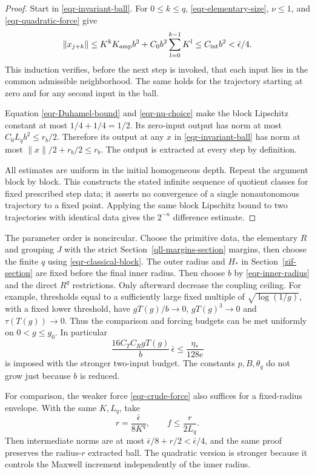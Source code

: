 \documentclass[11pt]{article}
\theoremstyle{remark}
\begin{document}
\begin{proof}
Start in \eqref{eqr-invariant-ball}. For $0\le k\le q$,
\eqref{eqr-elementary-size}, $\nu\le1$, and
\eqref{eqr-quadratic-force} give
\begin{equation}
 \|x_{j+k}\|
 \le K^kK_{\rm amp}b^2+C_0b^2\sum_{l=0}^{k-1}K^l
 \le C_{\rm int}b^2<\bar\epsilon/4.
 \label{eqr-intermediate-bound}
\end{equation}
This induction verifies, before the next step is invoked, that
each input lies in the common admissible neighborhood. The
same holds for the trajectory starting at zero and for any
second input in the ball.

Equation \eqref{eqr-Duhamel-bound} and
\eqref{eqr-nu-choice} make the block Lipschitz constant at most
$1/4+1/4=1/2$. Its zero-input output has norm at most
$C_0L_qb^2\le r_b/2$. Therefore its output at any $x$ in
\eqref{eqr-invariant-ball} has norm at most
$\|x\|/2+r_b/2\le r_b$.
The output is extracted at every step by definition.

All estimates are uniform in the initial homogeneous depth.
Repeat the argument block by block. This constructs the
stated infinite sequence of quotient classes for fixed
prescribed step data; it asserts no convergence of a single
nonautonomous trajectory to a fixed point. Applying the same
block Lipschitz bound to two trajectories with identical data
gives the $2^{-n}$ difference estimate.
\end{proof}

The parameter order is noncircular. Choose the primitive data,
the elementary $R$ and grouping $J$ with the strict
Section~\ref{qll-margins-section} margins, then choose the finite
$q$ using \eqref{eqr-classical-block}. The outer radius and
$H_*$ in Section~\ref{zif-section} are fixed before the final
inner radius. Then choose $b$ by
\eqref{eqr-inner-radius} and the direct $R^q$ restrictions.
Only afterward decrease the coupling ceiling. For example,
thresholds equal to a sufficiently large fixed multiple of
$\sqrt{\log(1/g)}$, with a fixed lower threshold, have
$gT(g)/b\to0$, $gT(g)^3\to0$ and $\tau(T(g))\to0$.
Thus the comparison and forcing budgets can be met uniformly
on $0<g\le g_0$. In particular
\[
 \frac{16C_TC_RgT(g)}b\,\bar\epsilon
                   \le\frac{\eta_*}{128e}
\]
is imposed with the stronger two-input budget.
The constants $p,B,\theta_q$ do not grow just because $b$
is reduced.

For comparison, the weaker force \eqref{eqr-crude-force} also
suffices for a fixed-radius envelope. With the same $K,L_q$,
take
\begin{equation}
 r=\frac{\bar\epsilon}{8K^q},\qquad
 f\le\frac{r}{2L_q}.
 \label{eqr-crude-envelope}
\end{equation}
Then intermediate norms are at most
$\bar\epsilon/8+r/2<\bar\epsilon/4$, and the same proof
preserves the radius-$r$ extracted ball. The quadratic
version is stronger because it controls the Maxwell
increment independently of the inner radius.
\end{document}
